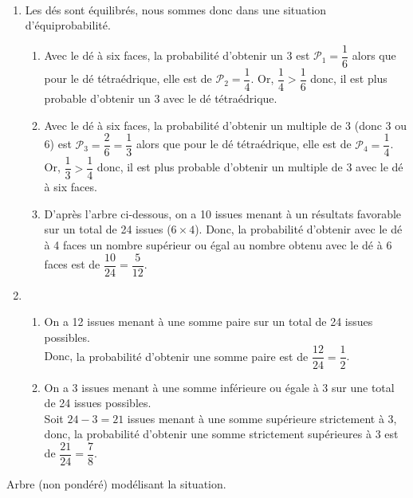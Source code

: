 \ \\ [-5mm]
   \begin{enumerate}
      \item Les dés sont équilibrés, nous sommes donc dans une situation d'équiprobabilité. \\
         \begin{enumerate}
            \item Avec le dé à six faces, la probabilité d'obtenir un 3 est $\mathcal{P}_1 =\dfrac16$ alors que pour le dé tétraédrique, elle est de $\mathcal{P}_2=\dfrac14$. Or, $\dfrac14>\dfrac16$ donc, {\blue il est plus probable d'obtenir un 3 avec le dé tétraédrique}.
            \item Avec le dé à six faces, la probabilité d'obtenir un multiple de 3 (donc 3 ou 6) est $\mathcal{P}_3 =\dfrac26 =\dfrac13$ alors que pour le dé tétraédrique, elle est de $\mathcal{P}_4 =\dfrac14$. Or, $\dfrac13>\dfrac14$ donc, {\blue il est plus probable d'obtenir un multiple de 3 avec le dé à six faces}.
            \item D'après l'arbre ci-dessous, on a 10 issues menant à un résultats favorable sur un total de 24 issues ($6\times4$). Donc, {\blue la probabilité d'obtenir avec le dé à 4 faces un nombre supérieur ou égal au nombre obtenu avec le dé à 6 faces est de $\dfrac{10}{24} =\dfrac{5}{12}$}. \smallskip
         \end{enumerate}
      \setcounter{enumi}{1}
      \item
         \begin{enumerate}
            \item On a 12 issues menant à une somme paire sur un total de 24 issues possibles. \\
               Donc, {\blue la probabilité d'obtenir une somme paire est de $\dfrac{12}{24} =\dfrac12$}. \smallskip
            \item On a 3 issues menant à une somme inférieure ou égale à 3 sur une total de 24 issues possibles. \\
               Soit $24-3 =21$ issues menant à une somme supérieure strictement à 3, donc, {\blue la probabilité d'obtenir une somme strictement supérieures à 3 est de $\dfrac{21}{24} =\dfrac78$}. \bigskip
         \end{enumerate}
   \end{enumerate}
   Arbre (non pondéré) modélisant la situation. \\
   \bigskip
   \hspace*{2.5cm}
